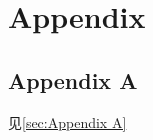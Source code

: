\documentclass{hmj}
\begin{document}





\section{Appendix}
\subsection{Appendix A}\label{sec:Appendix A}
见\autoref{sec:Appendix A}



\end{document}
